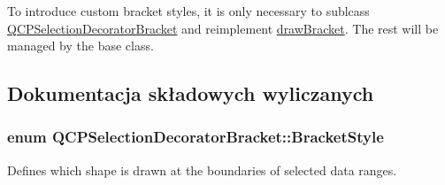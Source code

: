 To introduce custom bracket styles, it is only necessary to sublcass \hyperlink{class_q_c_p_selection_decorator_bracket}{Q\+C\+P\+Selection\+Decorator\+Bracket} and reimplement \hyperlink{class_q_c_p_selection_decorator_bracket_a8153966498e2a8d4c11c681e06d7d692}{draw\+Bracket}. The rest will be managed by the base class. 

\subsection{Dokumentacja składowych wyliczanych}
\subsubsection[{\texorpdfstring{Bracket\+Style}{BracketStyle}}]{\setlength{\rightskip}{0pt plus 5cm}enum {\bf Q\+C\+P\+Selection\+Decorator\+Bracket\+::\+Bracket\+Style}}\hypertarget{class_q_c_p_selection_decorator_bracket_aa6d18517ec0553575bbef0de4252336e}{}\label{class_q_c_p_selection_decorator_bracket_aa6d18517ec0553575bbef0de4252336e}
Defines which shape is drawn at the boundaries of selected data ranges.

